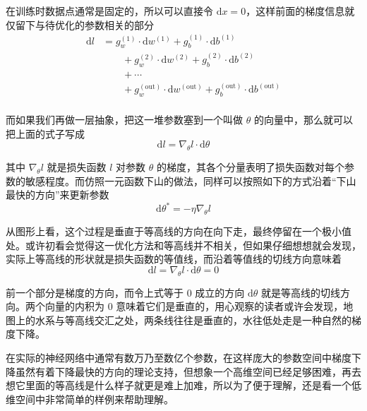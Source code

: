 在训练时数据点通常是固定的，所以可以直接令 $\mathrm{d}x = 0$，这样前面的梯度信息就仅留下与待优化的参数相关的部分
\[
\begin{aligned}
    \mathrm{d}l &= g_w^{(1)} \cdot \mathrm{d}w^{(1)} + g_b^{(1)} \cdot \mathrm{d}b^{(1)} \\
    &\qquad + g_w^{(2)} \cdot \mathrm{d}w^{(2)} + g_b^{(2)} \cdot \mathrm{d}b^{(2)} \\
    &\qquad + \cdots \\
    &\qquad + g_w^{(\text{out})} \cdot \mathrm{d}w^{(\text{out})} + g_b^{(\text{out})} \cdot \mathrm{d}b^{(\text{out})}\\
\end{aligned}
\]

而如果我们再做一层抽象，把这一堆参数塞到一个叫做 $\theta$ 的向量中，那么就可以把上面的式子写成
\[
    \mathrm{d}l = \nabla_\theta l \cdot \mathrm{d}\theta
\]

其中 $\nabla_\theta l$ 就是损失函数 $l$ 对参数 $\theta$ 的梯度，其各个分量表明了损失函数对每个参数的敏感程度。而仿照一元函数下山的做法，同样可以按照如下的方式沿着“下山最快的方向”来更新参数
\[
    \mathrm{d}\theta^* = -\eta \nabla_\theta l
\]

从图形上看，这个过程是垂直于等高线的方向在向下走，最终停留在一个极小值处。或许初看会觉得这一优化方法和等高线并不相关，但如果仔细想想就会发现，实际上等高线的形状就是损失函数的等值线，而沿着等值线的切线方向意味着
\[
    \mathrm{d}l = \nabla_\theta l \cdot \mathrm{d}\theta = 0
\]

前一个部分是梯度的方向，而令上式等于 $0$ 成立的方向 $\mathrm{d}\theta$ 就是等高线的切线方向。两个向量的内积为 $0$ 意味着它们是垂直的，用心观察的读者或许会发现，地图上的水系与等高线交汇之处，两条线往往是垂直的，水往低处走是一种自然的梯度下降。

在实际的神经网络中通常有数万乃至数亿个参数，在这样庞大的参数空间中梯度下降虽然有着下降最快的方向的理论支持，但想象一个高维空间已经足够困难，再去想它里面的等高线是什么样子就更是难上加难，所以为了便于理解，还是看一个低维空间中非常简单的样例来帮助理解。

